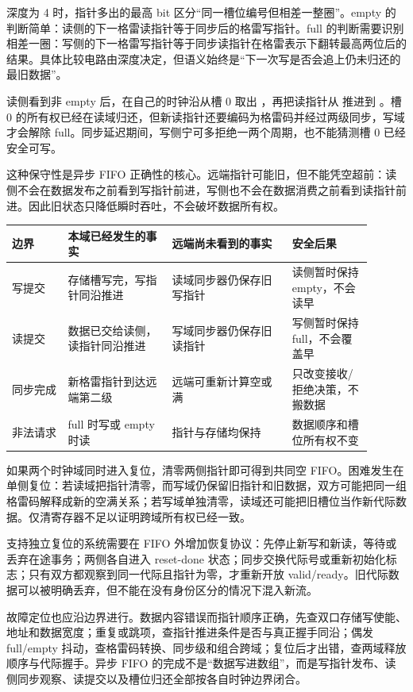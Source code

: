 深度为 4 时，指针多出的最高 bit 区分“同一槽位编号但相差一整圈”。empty 的判断简单：读侧的下一格雷读指针等于同步后的格雷写指针。full 的判断需要识别相差一圈：写侧的下一格雷写指针等于同步读指针在格雷表示下翻转最高两位后的结果。具体比较电路由深度决定，但语义始终是“下一次写是否会追上仍未归还的最旧数据”。


读侧看到非 empty 后，在自己的时钟沿从槽 0 取出 ，再把读指针从  推进到 。槽 0 的所有权已经在读域归还，但新读指针还要编码为格雷码并经过两级同步，写域才会解除 full。同步延迟期间，写侧宁可多拒绝一两个周期，也不能猜测槽 0 已经安全可写。

这种保守性是异步 FIFO 正确性的核心。远端指针可能旧，但不能凭空超前：读侧不会在数据发布之前看到写指针前进，写侧也不会在数据消费之前看到读指针前进。因此旧状态只降低瞬时吞吐，不会破坏数据所有权。

\begin{longtable}{L{0.14\linewidth}L{0.26\linewidth}L{0.30\linewidth}L{0.20\linewidth}}
\toprule
边界 & 本域已经发生的事实 & 远端尚未看到的事实 & 安全后果 \\
\midrule
写提交 & 存储槽写完，写指针同沿推进 & 读域同步器仍保存旧写指针 & 读侧暂时保持 empty，不会读早 \\\tablerowrule
读提交 & 数据已交给读侧，读指针同沿推进 & 写域同步器仍保存旧读指针 & 写侧暂时保持 full，不会覆盖早 \\\tablerowrule
同步完成 & 新格雷指针到达远端第二级 & 远端可重新计算空或满 & 只改变接收/拒绝决策，不搬数据 \\\tablerowrule
非法请求 & full 时写或 empty 时读 & 指针与存储均保持 & 数据顺序和槽位所有权不变 \\
\bottomrule
\end{longtable}


如果两个时钟域同时进入复位，清零两侧指针即可得到共同空 FIFO。困难发生在单侧复位：若读域把指针清零，而写域仍保留旧指针和旧数据，双方可能把同一组格雷码解释成新的空满关系；若写域单独清零，读域还可能把旧槽位当作新代际数据。仅清寄存器不足以证明跨域所有权已经一致。

支持独立复位的系统需要在 FIFO 外增加恢复协议：先停止新写和新读，等待或丢弃在途事务；两侧各自进入 reset-done 状态；同步交换代际号或重新初始化标志；只有双方都观察到同一代际且指针为零，才重新开放 valid/ready。旧代际数据可以被明确丢弃，但不能在没有身份区分的情况下混入新流。

故障定位也应沿边界进行。数据内容错误而指针顺序正确，先查双口存储写使能、地址和数据宽度；重复或跳项，查指针推进条件是否与真正握手同沿；偶发 full/empty 抖动，查格雷码转换、同步级和组合跨域；复位后才出错，查两域释放顺序与代际握手。异步 FIFO 的完成不是“数据写进数组”，而是写指针发布、读侧同步观察、读提交以及槽位归还全部按各自时钟边界闭合。

